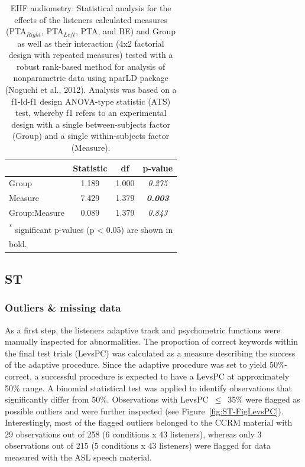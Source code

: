 \documentclass[a4paper, twoside]{templates/ociamthesis}
\begin{document}
\begin{table}

\caption{\label{tab:EHF-PTATabnparLD}EHF audiometry: Statistical analysis for the effects of the listeners calculated measures (PTA$_{Right}$, PTA$_{Left}$, PTA, and BE) and Group as well as their interaction (4x2 factorial design with repeated measures) tested with a robust rank-based method for analysis of nonparametric data using nparLD package (Noguchi et al., 2012). Analysis was based on a f1-ld-f1 design ANOVA-type statistic (ATS) test, whereby f1 refers to an experimental design with a single between-subjects factor (Group) and a single within-subjects factor (Measure).}
\centering
\begin{tabular}[t]{lcc>{}c}
\toprule
  & Statistic & df & p-value\\
\midrule
Group & 1.189 & 1.000 & \em{0.275}\\
Measure & 7.429 & 1.379 & \em{\textbf{0.003}}\\
Group:Measure & 0.089 & 1.379 & \em{0.843}\\
\bottomrule
\multicolumn{4}{l}{\textsuperscript{*} significant p-values (p < 0.05) are shown in}\\
\multicolumn{4}{l}{bold.}\\
\end{tabular}
\end{table}

\hypertarget{st}{%
\subsection{ST}\label{st}}

\hypertarget{outliers-missing-data}{%
\subsubsection*{Outliers \& missing data}\label{outliers-missing-data}}

As a first step, the listeners adaptive track and psychometric functions were manually inspected for abnormalities. The proportion of correct keywords within the final test trials (LevsPC) was calculated as a measure describing the success of the adaptive procedure. Since the adaptive procedure was set to yield 50\%-correct, a successful procedure is expected to have a LevsPC at approximately 50\% range. A binomial statistical test was applied to identify observations that significantly differ from 50\%. Observations with LevsPC~\(\leq\)~35\% were flagged as possible outliers and were further inspected (see Figure~\ref{fig:ST-FigLevsPC}). Interestingly, most of the flagged outliers belonged to the CCRM material with 29 observations out of 258 (6 conditions x 43 listeners), whereas only 3 observations out of 215 (5 conditions x 43 listeners) were flagged for data measured with the ASL speech material.\\
\end{document}
